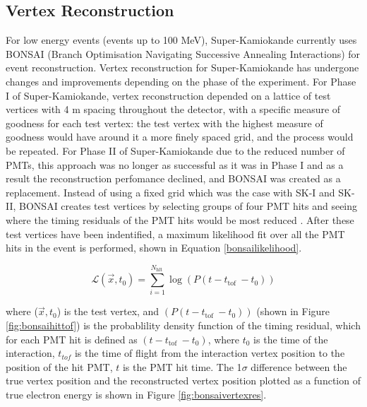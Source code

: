 \subsection{Vertex Reconstruction}
For low energy events (events up to 100 MeV), Super-Kamiokande currently uses BONSAI (Branch Optimisation Navigating Successive Annealing Interactions) for event reconstruction. Vertex reconstruction for Super-Kamiokande has undergone changes and improvements depending on the phase of the experiment. 
\newline{}
For Phase I of Super-Kamiokande, vertex reconstruction depended on a lattice of test vertices with 4 m spacing throughout the detector, with a specific measure of goodness for each test vertex: the test vertex with the highest measure of goodness would have around it a more finely spaced grid, and the process would be repeated. For Phase II of Super-Kamiokande due to the reduced number of PMTs, this approach was no longer as successful as it was in Phase I and as a result the reconstruction perfomance declined, and BONSAI was created as a replacement. Instead of using a fixed grid which was the case with SK-I and SK-II, BONSAI creates test vertices by selecting groups of four PMT hits and seeing where the timing residuals of the PMT hits would be most reduced \cite{caballerolow}. After these test vertices have been indentified, a maximum likelihood fit over all the PMT hits in the event is performed, shown in Equation \ref{bonsailikelihood}.

\begin{equation}
    \mathcal{L}(\vec{x}, t_{0})=\sum_{i=1}^{N_{\text {hlt }}} \log (P(t-t_{\text {tof }}-t_{0}))
\label{bonsailikelihood}
\end{equation}

where ($\vec{x}, t_{0}$) is the test vertex, and $(P(t-t_{\text {tof }}-t_{0}))$ (shown in Figure \ref{fig:bonsaihittof}) is the probablility density function of the timing residual, which for each PMT hit is defined as $(t-t_{\text {tof }}-t_{0})$, where $t_{0}$ is the time of the interaction, $t_{tof}$ is the time of flight from the interaction vertex position to the position of the hit PMT, $t$ is the PMT hit time. The 1$\sigma$ difference between the true vertex position and the reconstructed vertex position plotted as a function of true electron energy is shown in Figure \ref{fig:bonsaivertexres}. 

